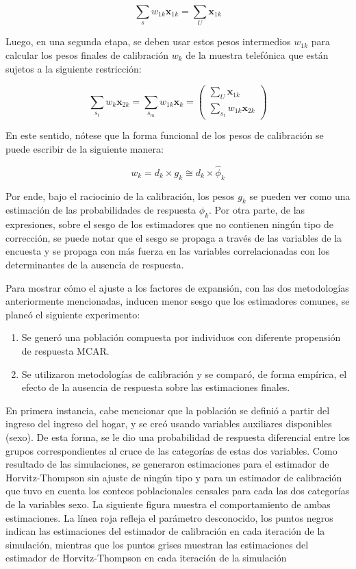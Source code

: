 \documentclass[
  10pt,
  spanish,
]{book}
\providecommand{\tightlist}{%
  \setlength{\itemsep}{0pt}\setlength{\parskip}{0pt}}
\begin{document}
\[
\sum_{s}w_{1k}\boldsymbol{x}_{1k} = \sum_{U}\boldsymbol{x}_{1k}
\]

Luego, en una segunda etapa, se deben usar estos pesos intermedios \(w_{1k}\) para calcular los pesos finales de calibración \(w_{k}\) de la muestra telefónica que están sujetos a la siguiente restricción:

\[
\sum_{s_t}w_{k}\boldsymbol{x}_{2k} = \sum_{s_m}w_{1k}\boldsymbol{x}_{k} = 
\begin{pmatrix}
\sum_{U}\boldsymbol{x}_{1k}\\
\sum_{s_t}w_{1k}\boldsymbol{x}_{2k}
\end{pmatrix}
\]

En este sentido, nótese que la forma funcional de los pesos de calibración se puede escribir de la siguiente manera:

\[
w_k = d_k \times g_k  \cong d_k \times \hat \phi_k
\]

Por ende, bajo el raciocinio de la calibración, los pesos \(g_k\) se pueden ver como una estimación de las probabilidades de respuesta \(\phi_k\). Por otra parte, de las expresiones, sobre el sesgo de los estimadores que no contienen ningún tipo de corrección, se puede notar que el sesgo se propaga a través de las variables de la encuesta y se propaga con más fuerza en las variables correlacionadas con los determinantes de la ausencia de respuesta.

Para mostrar cómo el ajuste a los factores de expansión, con las dos metodologías anteriormente mencionadas, inducen menor sesgo que los estimadores comunes, se planeó el siguiente experimento:

\begin{enumerate}
\def\labelenumi{\arabic{enumi}.}
\tightlist
\item
  Se generó una población compuesta por individuos con diferente propensión de respuesta MCAR.
\item
  Se utilizaron metodologías de calibración y se comparó, de forma empírica, el efecto de la ausencia de respuesta sobre las estimaciones finales.
\end{enumerate}

En primera instancia, cabe mencionar que la población se definió a partir del ingreso del ingreso del hogar, y se creó usando variables auxiliares disponibles (sexo). De esta forma, se le dio una probabilidad de respuesta diferencial entre los grupos correspondientes al cruce de las categorías de estas dos variables. Como resultado de las simulaciones, se generaron estimaciones para el estimador de Horvitz-Thompson sin ajuste de ningún tipo y para un estimador de calibración que tuvo en cuenta los conteos poblacionales censales para cada las dos categorías de la variables sexo. La siguiente figura muestra el comportamiento de ambas estimaciones. La línea roja refleja el parámetro desconocido, los puntos negros indican las estimaciones del estimador de calibración en cada iteración de la simulación, mientras que los puntos grises muestran las estimaciones del estimador de Horvitz-Thompson en cada iteración de la simulación
\end{document}

